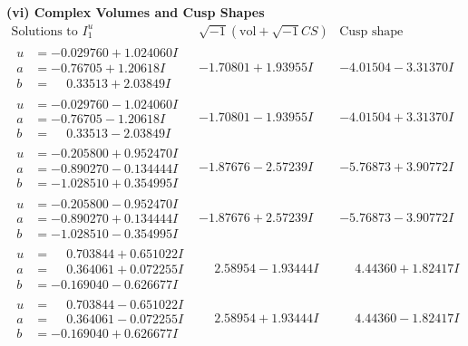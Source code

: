 \documentclass[1p]{elsarticle_modified}
\theoremstyle{definition}
\newcommand{\I}{\sqrt{-1}}
\begin{document}
\newpage\flushleft \textbf{(vi) Complex Volumes and Cusp Shapes}
$$\begin{array}{c|c|c}  
\text{Solutions to }I^u_{1}& \I (\text{vol} + \sqrt{-1}CS) & \text{Cusp shape}\\
 \hline 
\begin{aligned}
u &= -0.029760 + 1.024060 I \\
a &= -0.76705 + 1.20618 I \\
b &= \phantom{-}0.33513 + 2.03849 I\end{aligned}
 & -1.70801 + 1.93955 I & -4.01504 - 3.31370 I \\ \hline\begin{aligned}
u &= -0.029760 - 1.024060 I \\
a &= -0.76705 - 1.20618 I \\
b &= \phantom{-}0.33513 - 2.03849 I\end{aligned}
 & -1.70801 - 1.93955 I & -4.01504 + 3.31370 I \\ \hline\begin{aligned}
u &= -0.205800 + 0.952470 I \\
a &= -0.890270 - 0.134444 I \\
b &= -1.028510 + 0.354995 I\end{aligned}
 & -1.87676 - 2.57239 I & -5.76873 + 3.90772 I \\ \hline\begin{aligned}
u &= -0.205800 - 0.952470 I \\
a &= -0.890270 + 0.134444 I \\
b &= -1.028510 - 0.354995 I\end{aligned}
 & -1.87676 + 2.57239 I & -5.76873 - 3.90772 I \\ \hline\begin{aligned}
u &= \phantom{-}0.703844 + 0.651022 I \\
a &= \phantom{-}0.364061 + 0.072255 I \\
b &= -0.169040 - 0.626677 I\end{aligned}
 & \phantom{-}2.58954 - 1.93444 I & \phantom{-}4.44360 + 1.82417 I \\ \hline\begin{aligned}
u &= \phantom{-}0.703844 - 0.651022 I \\
a &= \phantom{-}0.364061 - 0.072255 I \\
b &= -0.169040 + 0.626677 I\end{aligned}
 & \phantom{-}2.58954 + 1.93444 I & \phantom{-}4.44360 - 1.82417 I \\ \hline\begin{aligned}

\end{aligned}
\end{array}$$
\end{document}

